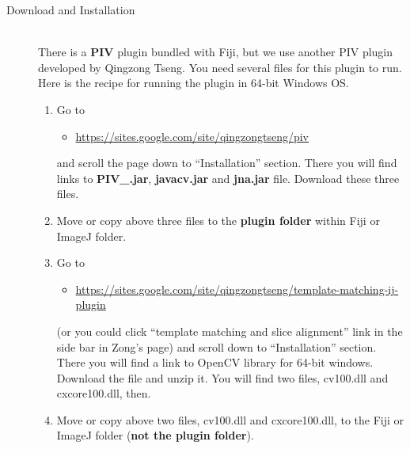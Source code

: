 \documentclass[11pnt]{article}
\begin{document}
\begin{description}
\item[Download and Installation]\hfill\\

There is a \textbf{PIV} plugin bundled with Fiji, but we use another PIV plugin developed by Qingzong Tseng. You need several files for this plugin to run. Here is the recipe for running the plugin in 64-bit Windows OS. 
 
\begin{enumerate}
\item Go to 
\begin{itemize}
\item\url{https://sites.google.com/site/qingzongtseng/piv} 
\end{itemize}
and scroll the page down to ``Installation'' section. There you will find links to \textbf{PIV\_.jar}, \textbf{javacv.jar} and \textbf{jna.jar} file. Download these three files.

\item Move or copy above three files to the \textbf{plugin folder} within Fiji or ImageJ folder. 

\item Go to 
\begin{itemize}
\item\url{https://sites.google.com/site/qingzongtseng/template-matching-ij-plugin} 
\end{itemize}
(or you could click ``template matching and slice alignment'' link in the side bar in Zong's page) and scroll down to ``Installation'' section. There you will find a link to OpenCV library for 64-bit windows. Download the file and unzip it. You will find two files, cv100.dll and cxcore100.dll, then. 

\item Move or copy above two files, cv100.dll and cxcore100.dll, to the Fiji or ImageJ folder (\textbf{not the plugin folder}).


\end{enumerate}
\end{description}
\end{document}
